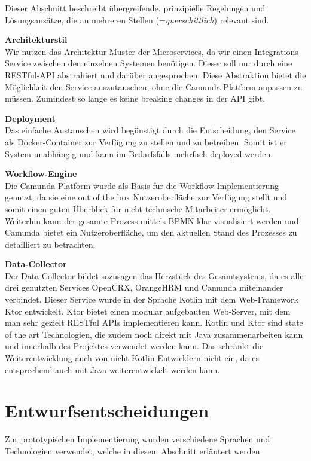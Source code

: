 \documentclass[]{article}
\begin{document}
Dieser Abschnitt beschreibt übergreifende, prinzipielle Regelungen und
Lösungsansätze, die an mehreren Stellen (=\emph{querschittlich})
relevant sind.

\textbf{Architekturstil}\\
Wir nutzen das Architektur-Muster der Microservices, da wir einen Integrations-Service zwischen den einzelnen Systemen benötigen.
Dieser soll nur durch eine RESTful-API abstrahiert und darüber angesprochen.
Diese Abstraktion bietet die Möglichkeit den Service auszutauschen, ohne die Camunda-Platform anpassen zu müssen. 
Zumindest so lange es keine breaking changes in der API gibt. 

\textbf{Deployment}\\
Das einfache Austauschen wird begünstigt durch die Entscheidung, den Service als Docker-Container zur Verfügung zu stellen und zu betreiben.
Somit ist er System unabhängig und kann im Bedarfsfalls mehrfach deployed werden.

\textbf{Workflow-Engine}\\
Die Camunda Platform wurde als Basis für die Workflow-Implementierung genutzt, da sie eine out of the box Nutzeroberfläche zur Verfügung stellt und somit einen guten Überblick für nicht-technische Mitarbeiter ermöglicht.
Weiterhin kann der gesamte Prozess mittels BPMN klar visualisiert werden und Camunda bietet ein Nutzeroberfläche, um den aktuellen Stand des Prozesses zu detailliert zu betrachten.

\textbf{Data-Collector}\\
Der Data-Collector bildet sozusagen das Herzstück des Gesamtsystems, da es alle drei genutzten Services OpenCRX, OrangeHRM und Camunda miteinander verbindet.
Dieser Service wurde in der Sprache Kotlin mit dem Web-Framework Ktor entwickelt. 
Ktor bietet einen modular aufgebauten Web-Server, mit dem man sehr gezielt RESTful APIs implementieren kann.
Kotlin und Ktor sind state of the art Technologien, die zudem noch direkt mit Java zusammenarbeiten kann und innerhalb des Projektes verwendet werden kann. 
Das schränkt die Weiterentwicklung auch von nicht Kotlin Entwicklern nicht ein, da es entsprechend auch mit Java weiterentwickelt werden kann.

\hypertarget{section-design-decisions}{%
\section{Entwurfsentscheidungen}\label{section-design-decisions}}

Zur prototypischen Implementierung wurden verschiedene Sprachen und Technologien verwendet, welche in diesem Abschnitt erläutert werden.
\end{document}
